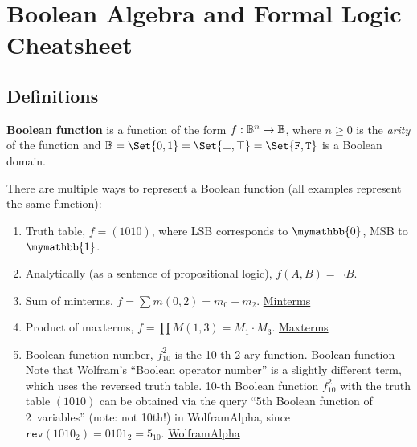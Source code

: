 \documentclass[a4paper,10pt]{article}
\begin{document}

\setcounter{section}{2}
\section{Boolean Algebra and Formal Logic Cheatsheet}

\subsection{Definitions}

\begin{terms}
    \item \raggedright \textbf{Boolean function} is a function of the form $f: \mathbb{B}^n \to \mathbb{B}$, where $n \geq 0$ is the \emph{arity} of the function and $\Bool =\nobreak \Set{0, 1} =\nobreak \Set{\bot, \top} =\nobreak \Set{\texttt{F}, \texttt{T}}$ is a Boolean domain.

    \item There are multiple ways to represent a Boolean function (all examples represent the same function):

    \begin{enumerate}[left=6pt .. 18pt]
        \item Truth table, \eg $f = (1010)$, where LSB corresponds to $\mymathbb{0}$, MSB to $\mymathbb{1}$.

        \item Analytically (as a sentence of propositional logic), \eg $f(A,B) = \neg B$.

        \item Sum of minterms, \eg $f = \sum m(0,2) = m_0 + m_2$.
        \hfill\href{http://www.cs.ucr.edu/~ehwang/courses/cs120a/minterms.pdf}{Minterms}

        \item Product of maxterms, \eg $f = \prod M(1,3) = M_1 \cdot M_3$.
        \hfill\href{http://www.cs.ucr.edu/~ehwang/courses/cs120a/minterms.pdf#page=2}{Maxterms}

        \item Boolean function number, \eg $f^{2}_{10}$ is the 10-th 2-ary function.
        \hfill\href{https://mathworld.wolfram.com/BooleanFunction.html}{Boolean function} \\
        Note that Wolfram's \enquote{Boolean operator number} is a slightly different term, which uses the reversed truth table. 10-th Boolean function $f^{2}_{10}$ with the truth table $(1010)$ can be obtained via the query \enquote{5th Boolean function of 2~variables} (note: not 10th!) in WolframAlpha, since $\texttt{rev}(1010_2) = 0101_2 = 5_{10}$.
        \hfill\href{https://bit.ly/3nFbad5}{WolframAlpha}


\end{enumerate}
\end{terms}
\end{document}
